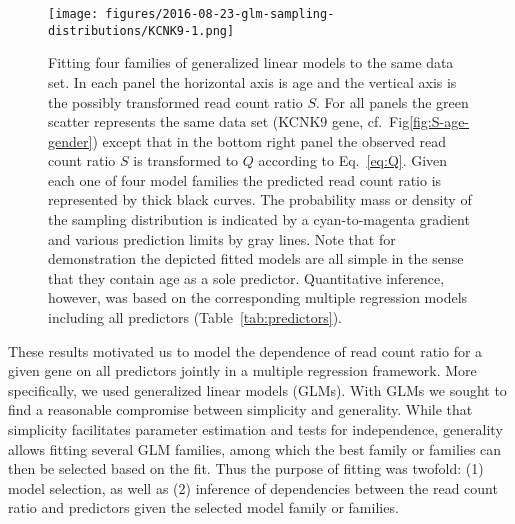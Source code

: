 \documentclass[letterpaper]{article}
\begin{document}
\begin{figure}
\begin{center}
\texttt{[image: figures/2016-08-23-glm-sampling-distributions/KCNK9-1.png]}
\end{center}
\caption{Fitting four families of generalized linear models to the same data
set.  In each panel the horizontal axis is age and the vertical axis is the
possibly transformed read count ratio \(S\).  For all panels the green scatter
represents the same data set (KCNK9 gene, cf.~Fig\ref{fig:S-age-gender})
except that in the bottom right panel the observed read count ratio \(S\) is
transformed to \(Q\) according to Eq.~\ref{eq:Q}.  Given each one of four model
families the predicted read count ratio is represented by thick black curves.
The probability mass or density of the sampling distribution is indicated by a
cyan-to-magenta gradient and various prediction limits by gray lines.  Note
that for demonstration the depicted fitted models are all simple in the sense
that they contain age as a sole predictor.  Quantitative inference, however,
was based on the corresponding multiple regression models including all
predictors (Table~\ref{tab:predictors}).
  }
\label{fig:predicted-curves}
\end{figure}

These results motivated us to model the dependence of read count ratio for a
given gene on all predictors jointly in a multiple regression framework.  More
specifically, we used generalized linear models (GLMs).  With GLMs we sought
to find a reasonable compromise between simplicity and generality.  While that
simplicity facilitates parameter estimation and tests for independence,
generality allows fitting several GLM families, among which the best family or
families can then be selected based on the fit.  Thus the purpose of fitting
was twofold: (1) model selection, as well as (2) inference of dependencies
between the read count ratio and predictors given the selected model family or
families.
\end{document}
